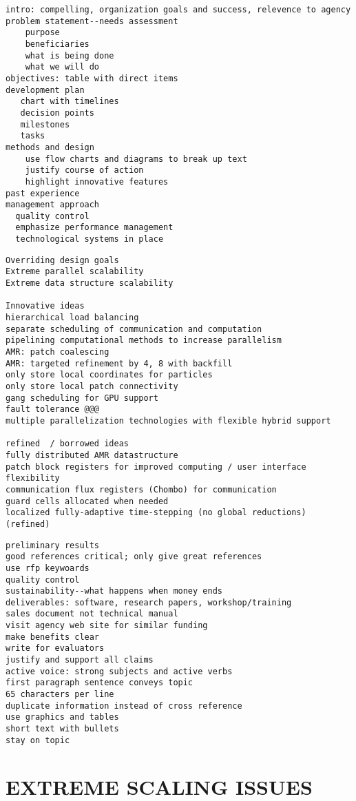 \documentclass[14pt,letter]{article}
\begin{document}
\begin{verbatim}
intro: compelling, organization goals and success, relevence to agency
problem statement--needs assessment
    purpose
    beneficiaries
    what is being done
    what we will do
objectives: table with direct items
development plan
   chart with timelines
   decision points
   milestones
   tasks
methods and design
    use flow charts and diagrams to break up text
    justify course of action
    highlight innovative features
past experience
management approach
  quality control
  emphasize performance management
  technological systems in place
\end{verbatim}

\begin{verbatim}
Overriding design goals
Extreme parallel scalability
Extreme data structure scalability

Innovative ideas
hierarchical load balancing
separate scheduling of communication and computation
pipelining computational methods to increase parallelism
AMR: patch coalescing
AMR: targeted refinement by 4, 8 with backfill
only store local coordinates for particles
only store local patch connectivity
gang scheduling for GPU support
fault tolerance @@@
multiple parallelization technologies with flexible hybrid support

refined  / borrowed ideas
fully distributed AMR datastructure
patch block registers for improved computing / user interface flexibility
communication flux registers (Chombo) for communication
guard cells allocated when needed
localized fully-adaptive time-stepping (no global reductions) (refined)
\end{verbatim}


\begin{verbatim}
preliminary results
good references critical; only give great references
use rfp keywoards
quality control
sustainability--what happens when money ends
deliverables: software, research papers, workshop/training
sales document not technical manual
visit agency web site for similar funding
make benefits clear
write for evaluators
justify and support all claims
active voice: strong subjects and active verbs
first paragraph sentence conveys topic
65 characters per line
duplicate information instead of cross reference
use graphics and tables
short text with bullets
stay on topic
\end{verbatim}

\section{EXTREME SCALING ISSUES} \label{s:issues}
\end{document}
